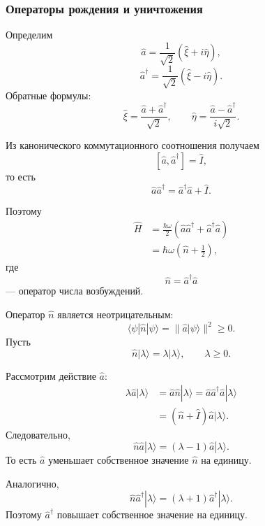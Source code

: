 \documentclass[12pt,a4paper]{article}
\begin{document}
\subsubsection{Операторы рождения и уничтожения}

Определим
\[
    \boxed{
        \hat a
        =
        \frac{1}{\sqrt2}
        (\hat\xi+i\hat\eta)
    },
\]
\[
    \boxed{
        \hat a^\dagger
        =
        \frac{1}{\sqrt2}
        (\hat\xi-i\hat\eta)
    }.
\]
Обратные формулы:
\[
    \boxed{
        \hat\xi
        =
        \frac{\hat a+\hat a^\dagger}{\sqrt2},
        \qquad
        \hat\eta
        =
        \frac{\hat a-\hat a^\dagger}{i\sqrt2}
    }.
\]

Из канонического коммутационного соотношения получаем
\[
    \boxed{
        [\hat a,\hat a^\dagger]=\hat I
    },
\]
то есть
\[
    \hat a\hat a^\dagger
    =
    \hat a^\dagger\hat a+\hat I.
\]

Поэтому
\begin{align*}
    \hat H
    &=
    \frac{\hbar\omega}{2}
    \left(
        \hat a\hat a^\dagger
        +
        \hat a^\dagger\hat a
    \right)
    \\
    &=
    \boxed{
        \hbar\omega
        \left(
            \hat n+\frac12
        \right)
    },
\end{align*}
где
\[
    \boxed{
        \hat n=\hat a^\dagger\hat a
    }
\]
--- оператор числа возбуждений.

Оператор $\hat n$ является неотрицательным:
\[
    \langle\psi|\hat n|\psi\rangle
    =
    \|\hat a|\psi\rangle\|^2
    \geq0.
\]
Пусть
\[
    \hat n|\lambda\rangle
    =
    \lambda|\lambda\rangle,
    \qquad
    \lambda\geq0.
\]

Рассмотрим действие $\hat a$:
\[
\begin{aligned}
    \lambda\hat a|\lambda\rangle
    &=
    \hat a\hat n|\lambda\rangle
    =
    \hat a\hat a^\dagger\hat a|\lambda\rangle
    \\
    &=
    (\hat n+\hat I)
    \hat a|\lambda\rangle.
\end{aligned}
\]
Следовательно,
\[
    \boxed{
        \hat n\hat a|\lambda\rangle
        =
        (\lambda-1)\hat a|\lambda\rangle
    }.
\]
То есть $\hat a$ уменьшает собственное значение $\hat n$ на единицу.

Аналогично,
\[
    \boxed{
        \hat n\hat a^\dagger|\lambda\rangle
        =
        (\lambda+1)
        \hat a^\dagger|\lambda\rangle
    }.
\]
Поэтому $\hat a^\dagger$ повышает собственное значение на единицу.
\end{document}
